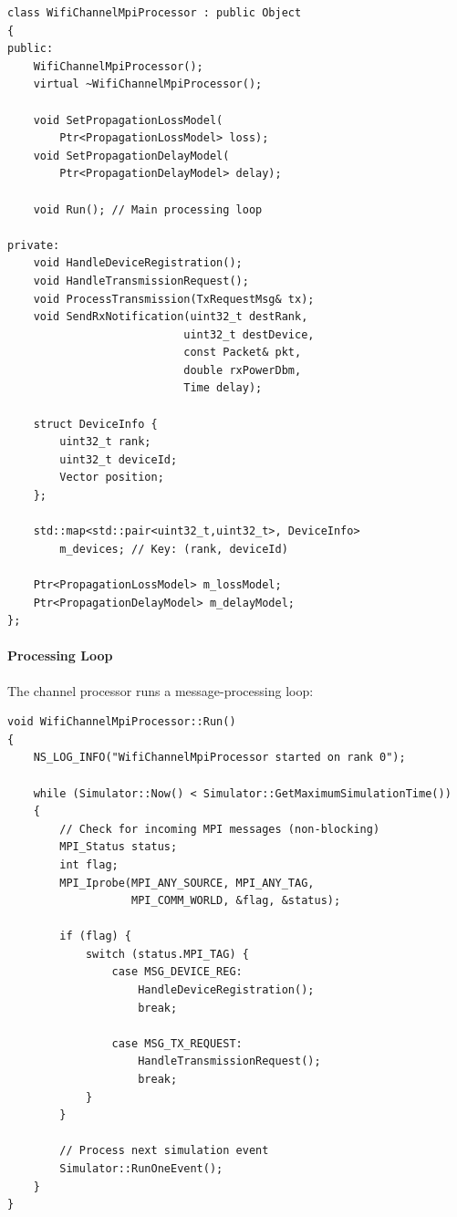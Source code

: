 \begin{lstlisting}[style=cpp, caption={WifiChannelMpiProcessor class declaration}]
class WifiChannelMpiProcessor : public Object
{
public:
    WifiChannelMpiProcessor();
    virtual ~WifiChannelMpiProcessor();
    
    void SetPropagationLossModel(
        Ptr<PropagationLossModel> loss);
    void SetPropagationDelayModel(
        Ptr<PropagationDelayModel> delay);
    
    void Run(); // Main processing loop
    
private:
    void HandleDeviceRegistration();
    void HandleTransmissionRequest();
    void ProcessTransmission(TxRequestMsg& tx);
    void SendRxNotification(uint32_t destRank,
                           uint32_t destDevice,
                           const Packet& pkt,
                           double rxPowerDbm,
                           Time delay);
    
    struct DeviceInfo {
        uint32_t rank;
        uint32_t deviceId;
        Vector position;
    };
    
    std::map<std::pair<uint32_t,uint32_t>, DeviceInfo> 
        m_devices; // Key: (rank, deviceId)
    
    Ptr<PropagationLossModel> m_lossModel;
    Ptr<PropagationDelayModel> m_delayModel;
};
\end{lstlisting}

\paragraph{Processing Loop}
The channel processor runs a message-processing loop:

\begin{lstlisting}[style=cpp, caption={Channel processor main loop}]
void WifiChannelMpiProcessor::Run()
{
    NS_LOG_INFO("WifiChannelMpiProcessor started on rank 0");
    
    while (Simulator::Now() < Simulator::GetMaximumSimulationTime())
    {
        // Check for incoming MPI messages (non-blocking)
        MPI_Status status;
        int flag;
        MPI_Iprobe(MPI_ANY_SOURCE, MPI_ANY_TAG,
                   MPI_COMM_WORLD, &flag, &status);
        
        if (flag) {
            switch (status.MPI_TAG) {
                case MSG_DEVICE_REG:
                    HandleDeviceRegistration();
                    break;
                    
                case MSG_TX_REQUEST:
                    HandleTransmissionRequest();
                    break;
            }
        }
        
        // Process next simulation event
        Simulator::RunOneEvent();
    }
}
\end{lstlisting}

